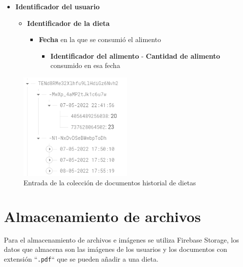 \begin{itemize}
    \item \textbf{Identificador del usuario}
    \begin{itemize}
        \item \textbf{Identificador de la dieta} 
        \begin{itemize}
            \item \textbf{Fecha} en la que se consumió el alimento
              \begin{itemize}
                \item \textbf{Identificador del alimento} - \textbf{Cantidad de alimento} consumido en esa fecha
              \end{itemize} 
        \end{itemize}
    \end{itemize}    
\end{itemize}


\begin{figure}[H]
    \centering
    \includegraphics[width=0.5\textwidth]{Images/Capitulo5/dietHistoryTable.png}
    \caption{Entrada de la colección de documentos historial de dietas}
    \label{fig:diet_history_table}
\end{figure}


\section{Almacenamiento de archivos}
Para el almacenamiento de archivos e imágenes se utiliza Firebase Storage, los datos que almacena son las imágenes de los usuarios y los documentos con extensión ``\texttt{.pdf}`` que se pueden añadir a una dieta.

